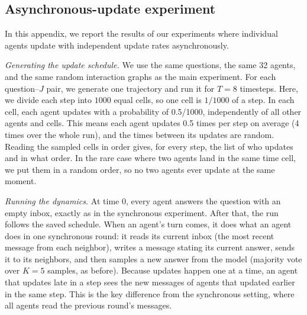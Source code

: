 \newpage 
\subsection{Asynchronous-update experiment}\label{apdx:async_update}

In this appendix, we report the results of our experiments where  individual agents update with independent update rates asynchronously. 

\textit{Generating the update schedule.} We use the same questions, the same 32 agents, and the same random interaction graphs as the main experiment. For each question–$J$ pair, we generate one trajectory and run it for $T=8$ timesteps. Here, we divide each step into $1000$ equal cells, so one cell is $1/1000 $ of a step. In each cell, each agent updates with a probability of 0.5/1000, independently of all other agents and cells. This means each agent updates 0.5 times per step on average (4 times over the whole run), and the times between its updates are random. Reading the sampled cells in order gives, for every step, the list of who updates and in what order. In the rare case where two agents land in the same time cell, we put them in a random order, so no two agents ever update at the same moment. 

\textit{Running the dynamics.} At time $0$, every agent answers the question with an empty inbox, exactly as in the synchronous experiment. After that, the run follows the saved schedule. When an agent's turn comes, it does what an agent does in one synchronous round: it reads its current inbox (the most recent message from each neighbor), writes a message stating its current answer, sends it to its neighbors, and then samples a new answer from the model (majority vote over $K = 5$ samples, as before). Because updates happen one at a time, an agent that updates late in a step sees the new messages of agents that updated earlier in the same step. This is the key difference from the synchronous setting, where all agents read the previous round's messages.

